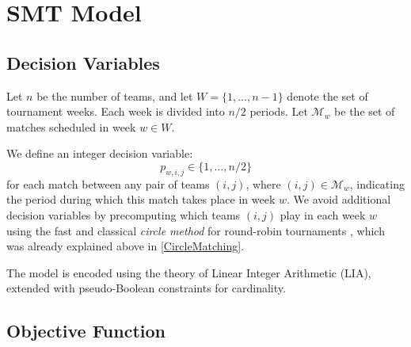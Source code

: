 


\section{SMT Model}

\subsection{Decision Variables}

Let $n$ be the number of teams, and let $W = \{1, \dots, n - 1\}$ denote the set of tournament weeks. Each week is divided into $n/2$ periods. Let $\mathcal{M}_w$ be the set of matches scheduled in week $w \in W$.

We define an integer decision variable:
\[
p_{w,i,j} \in \{1, \dots, n/2\}
\]
for each match between any pair of teams $(i,j)$, where $(i,j) \in \mathcal{M}_w$, indicating the period during which this match takes place in week $w$.
We avoid additional decision variables by precomputing which teams $(i, j)$ play in each week $w$ using the fast and classical \emph{circle method} for round-robin tournaments \cite{dewerra1999}, which was already explained above in \ref{CircleMatching}.

The model is encoded using the theory of Linear Integer Arithmetic (LIA), extended with pseudo-Boolean constraints for cardinality.




\subsection{Objective Function}

